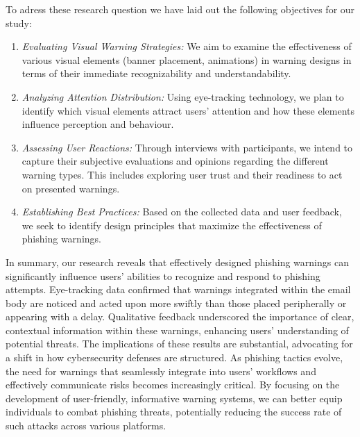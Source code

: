 \documentclass[
  a4paper,  %
  twoside,  %
  bibliography=totoc,
  headsepline,
  cleardoublepage=empty,
  parskip=half,
  draft=false
]{scrbook}
\begin{document}
To adress these research question we have laid out the following objectives for our study:

\begin{enumerate}
    \item \textit{Evaluating Visual Warning Strategies:} We aim to examine the effectiveness of various visual elements (banner placement, animations) in warning designs in terms of their immediate recognizability and understandability.
    \item \textit{Analyzing Attention Distribution:} Using eye-tracking technology, we plan to identify which visual elements attract users' attention and how these elements influence perception and behaviour.
    \item \textit{Assessing User Reactions:} Through interviews with participants, we intend to capture their subjective evaluations and opinions regarding the different warning types. This includes exploring user trust and their readiness to act on presented warnings.
    \item \textit{Establishing Best Practices:} Based on the collected data and user feedback, we seek to identify design principles that maximize the effectiveness of phishing warnings.
\end{enumerate}

In summary, our research reveals that effectively designed phishing warnings can significantly influence users' abilities to recognize and respond to phishing attempts. Eye-tracking data confirmed that warnings integrated within the email body are noticed and acted upon more swiftly than those placed peripherally or appearing with a delay. Qualitative feedback underscored the importance of clear, contextual information within these warnings, enhancing users' understanding of potential threats. \newline
The implications of these results are substantial, advocating for a shift in how cybersecurity defenses are structured. As phishing tactics evolve, the need for warnings that seamlessly integrate into users' workflows and effectively communicate risks becomes increasingly critical. By focusing on the development of user-friendly, informative warning systems, we can better equip individuals to combat phishing threats, potentially reducing the success rate of such attacks across various platforms. 
\end{document}
